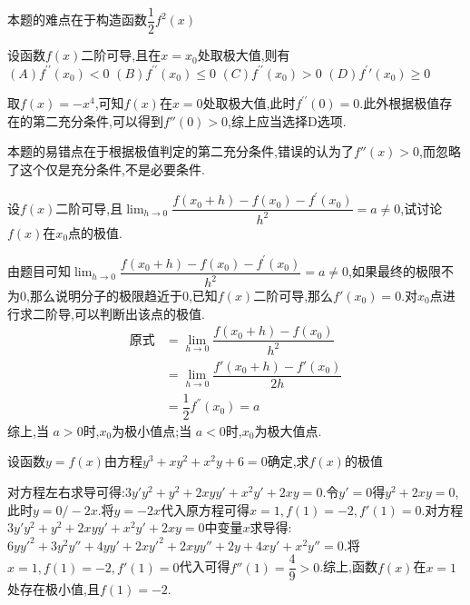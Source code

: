 \documentclass[8pt a4paper, oneside, UTF8]{ctexbook}  %
\begin{document}
\begin{sloppypar}
\begin{solution}
    \end{solution}
    \begin{note}
        本题的难点在于构造函数$\dfrac{1}{2}f^2(x)$
    \end{note}
    \begin{problem}
    设函数$f(x)$二阶可导,且在$x=x_0$处取极大值,则有\\
    $(A)f^{\prime\prime}(x_0)<0$ \quad $(B)f^{\prime\prime}(x_0)\leqslant0$ \quad $(C)f^{\prime\prime}(x_0)>0$ \quad $(D)f^\prime\prime(x_0)\geqslant0$
    \end{problem}
    \begin{solution}
        取$f(x)=-x^4$,可知$f(x)$在$x=0$处取极大值,此时$f^{\prime\prime}(0)=0$.此外根据极值存在的第二充分条件,可以得到$f''(0)>0$,综上应当选择D选项.
    \end{solution}
    \begin{note}
        本题的易错点在于根据极值判定的第二充分条件,错误的认为了$f''(x)>0$,而忽略了这个仅是充分条件,不是必要条件.
    \end{note}
    \begin{problem}
    设$f(x)$二阶可导,且$\operatorname*{lim}_{h\to0}\dfrac{f(x_{0}+h)-f(x_{0})-f^{\prime}(x_{0})}{h^{2}}=a\neq0$,试讨论$f(x)$在$x_{0}$点的极值.
    \end{problem}
    \begin{solution}
        由题目可知$\operatorname*{lim}_{h\to0}\dfrac{f(x_{0}+h)-f(x_{0})-f^{\prime}(x_{0})}{h^{2}}=a\neq0$,如果最终的极限不为0,那么说明分子的极限趋近于0,已知$f(x)$二阶可导,那么$f'(x_0)=0$.对$x_0$点进行求二阶导,可以判断出该点的极值.
        \begin{align*}
            \text{原式} & = \lim_{h\to 0}\dfrac{f(x_0+h)-f(x_0)}{h^2}  \\
                      & = \lim_{h\to 0}\dfrac{f'(x_0+h)-f'(x_0)}{2h} \\
                      & = \dfrac{1}{2}f^{''}(x_0)=a
        \end{align*}
        综上,当 $a>0$时,$x_0$为极小值点;当 $a<0$时,$x_0$为极大值点.
    \end{solution}
    \begin{problem}
    设函数$y=f(x)$由方程$y^{3}+xy^{2}+x^{2}y+6=0$确定,求$f(x)$的极值
    \end{problem}
    \begin{solution}
        对方程左右求导可得:$3y'y^2+y^2+2xyy'+x^2y'+2xy=0$.令$y'=0$得$y^2+2xy=0$,此时$y=0/-2x$.将$y=-2x$代入原方程可得$x=1,f(1)=-2,f'(1)=0$.对方程$3y'y^2+y^2+2xyy'+x^2y'+2xy=0$中变量$x$求导得:$6yy'^2+3y^2y''+4yy'+2xy'^2+2xyy''+2y+4xy'+x^2y''=0$.将$x=1,f(1)=-2,f'(1)=0$代入可得$f''(1)=\dfrac{4}{9}>0$.综上,函数$f(x)$在$x=1$处存在极小值,且$f(1)=-2$.

\end{solution}
\end{sloppypar}
\end{document}

